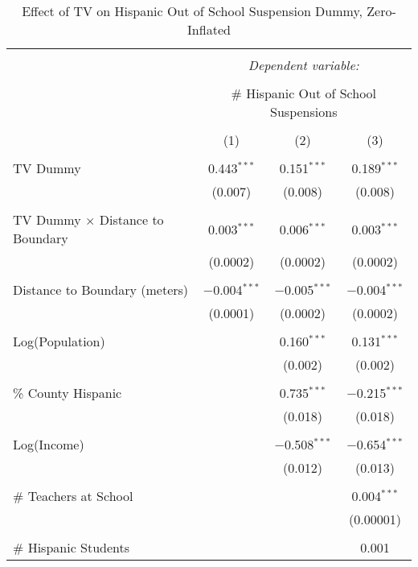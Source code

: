 
\begin{table}[!htbp] \centering 
  \caption{Effect of TV on Hispanic Out of School Suspension Dummy, Zero-Inflated} 
  \label{} 
\begin{tabular}{@{\extracolsep{-2pt}}lccc} 
\\[-1.8ex]\hline 
\hline \\[-1.8ex] 
 & \multicolumn{3}{c}{\textit{Dependent variable:}} \\ 
\cline{2-4} 
\\[-1.8ex] & \multicolumn{3}{c}{\# Hispanic Out of School Suspensions} \\ 
\\[-1.8ex] & (1) & (2) & (3)\\ 
\hline \\[-1.8ex] 
 TV Dummy & 0.443$^{***}$ & 0.151$^{***}$ & 0.189$^{***}$ \\ 
  & (0.007) & (0.008) & (0.008) \\ 
  & & & \\ 
 TV Dummy $\times$ Distance to Boundary & 0.003$^{***}$ & 0.006$^{***}$ & 0.003$^{***}$ \\ 
  & (0.0002) & (0.0002) & (0.0002) \\ 
  & & & \\ 
 Distance to Boundary (meters) & $-$0.004$^{***}$ & $-$0.005$^{***}$ & $-$0.004$^{***}$ \\ 
  & (0.0001) & (0.0002) & (0.0002) \\ 
  & & & \\ 
 Log(Population) &  & 0.160$^{***}$ & 0.131$^{***}$ \\ 
  &  & (0.002) & (0.002) \\ 
  & & & \\ 
 \% County Hispanic &  & 0.735$^{***}$ & $-$0.215$^{***}$ \\ 
  &  & (0.018) & (0.018) \\ 
  & & & \\ 
 Log(Income) &  & $-$0.508$^{***}$ & $-$0.654$^{***}$ \\ 
  &  & (0.012) & (0.013) \\ 
  & & & \\ 
 \# Teachers at School &  &  & 0.004$^{***}$ \\ 
  &  &  & (0.00001) \\ 
  & & & \\ 
 \# Hispanic Students &  &  & 0.001 \\ 

\end{tabular}
\end{table}
